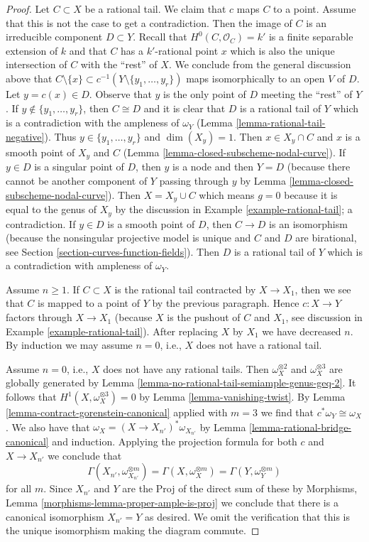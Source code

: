 \begin{proof}
\medskip\noindent
Let $C \subset X$ be a rational tail.
We claim that $c$ maps $C$ to a point. Assume that this
is not the case to get a contradiction. Then the image
of $C$ is an irreducible component $D \subset Y$.
Recall that $H^0(C, \mathcal{O}_C) = k'$ is a finite separable
extension of $k$ and that $C$ has a $k'$-rational point $x$
which is also the unique intersection of $C$ with the ``rest'' of $X$.
We conclude from the general discussion above that
$C \setminus \{x\} \subset c^{-1}(Y \setminus \{y_1, \ldots, y_r\})$
maps isomorphically to an open $V$ of $D$. Let $y = c(x) \in D$.
Observe that $y$ is the only point of $D$ meeting the
``rest'' of $Y$. If $y \not \in \{y_1, \ldots, y_r\}$, then $C \cong D$
and it is clear that $D$ is a rational tail of $Y$ which is
a contradiction with the ampleness of $\omega_Y$
(Lemma \ref{lemma-rational-tail-negative}).
Thus $y \in \{y_1, \ldots, y_r\}$ and $\dim(X_y) = 1$.
Then $x \in X_y \cap C$ and $x$ is a smooth point of $X_y$ and $C$
(Lemma \ref{lemma-closed-subscheme-nodal-curve}).
If $y \in D$ is a singular point of $D$, then $y$ is a node
and then $Y = D$ (because there cannot be another component of
$Y$ passing through $y$ by Lemma \ref{lemma-closed-subscheme-nodal-curve}).
Then $X = X_y \cup C$ which means $g = 0$ because it is
equal to the genus of $X_y$ by the discussion in
Example \ref{example-rational-tail}; a contradiction.
If $y \in D$ is a smooth point of $D$, then
$C \to D$ is an isomorphism (because the nonsingular projective
model is unique and $C$ and $D$ are birational, see
Section \ref{section-curves-function-fields}). Then $D$ is
a rational tail of $Y$ which is a contradiction with
ampleness of $\omega_Y$.

\medskip\noindent
Assume $n \geq 1$. If $C \subset X$ is the rational tail contracted
by $X \to X_1$, then we see that $C$ is mapped to a point of $Y$ by
the previous paragraph. Hence $c : X \to Y$ factors through $X \to X_1$
(because $X$ is the pushout of $C$ and $X_1$, see discussion in
Example \ref{example-rational-tail}).
After replacing $X$ by $X_1$ we have decreased
$n$. By induction we may assume $n = 0$, i.e., $X$ does not have
a rational tail.

\medskip\noindent
Assume $n = 0$, i.e., $X$ does not have any rational tails.
Then $\omega_X^{\otimes 2}$ and $\omega_X^{\otimes 3}$ are
globally generated by Lemma \ref{lemma-no-rational-tail-semiample-genus-geq-2}.
It follows that $H^1(X, \omega_X^{\otimes 3}) = 0$ by
Lemma \ref{lemma-vanishing-twist}.
By Lemma \ref{lemma-contract-gorenstein-canonical} applied with $m = 3$
we find that $c^*\omega_Y \cong \omega_X$.
We also have that $\omega_X = (X \to X_{n'})^*\omega_{X_{n'}}$ by
Lemma \ref{lemma-rational-bridge-canonical} and induction.
Applying the projection formula for both $c$ and
$X \to X_{n'}$ we conclude that
$$
\Gamma(X_{n'}, \omega_{X_{n'}}^{\otimes m}) =
\Gamma(X, \omega_X^{\otimes m}) =
\Gamma(Y, \omega_Y^{\otimes m})
$$
for all $m$.
Since $X_{n'}$ and $Y$ are the Proj of the direct sum of these
by Morphisms, Lemma \ref{morphisms-lemma-proper-ample-is-proj}
we conclude that there is a canonical isomorphism $X_{n'} = Y$
as desired. We omit the verification that this is the unique
isomorphism making the diagram commute.
\end{proof}


